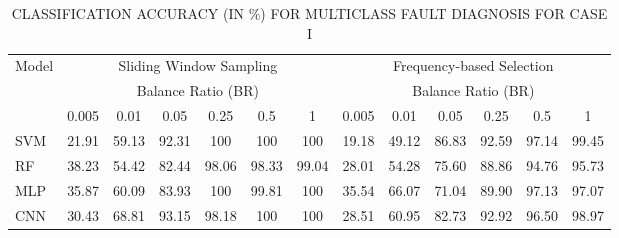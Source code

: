 \begin{table}[htbp]
\centering
\caption{CLASSIFICATION ACCURACY (IN \%) FOR MULTICLASS FAULT DIAGNOSIS FOR CASE I}
\label{tab:accuracy_caseI}
\begin{tabular}{lcccccccccccc}
\toprule
\multirow{2}{*}{Model} & \multicolumn{6}{c}{Sliding Window Sampling} & \multicolumn{6}{c}{Frequency-based Selection} \\
 & \multicolumn{6}{c}{Balance Ratio (BR)} & \multicolumn{6}{c}{Balance Ratio (BR)} \\
 & 0.005 & 0.01 & 0.05 & 0.25 & 0.5 & 1 & 0.005 & 0.01 & 0.05 & 0.25 & 0.5 & 1 \\
\midrule
SVM & 21.91 & 59.13 & 92.31 & 100 & 100 & 100 & 19.18 & 49.12 & 86.83 & 92.59 & 97.14 & 99.45 \\
RF & 38.23 & 54.42 & 82.44 & 98.06 & 98.33 & 99.04 & 28.01 & 54.28 & 75.60 & 88.86 & 94.76 & 95.73 \\
MLP & 35.87 & 60.09 & 83.93 & 100 & 99.81 & 100 & 35.54 & 66.07 & 71.04 & 89.90 & 97.13 & 97.07 \\
CNN & 30.43 & 68.81 & 93.15 & 98.18 & 100 & 100 & 28.51 & 60.95 & 82.73 & 92.92 & 96.50 & 98.97 \\
\bottomrule
\end{tabular}
\end{table}

